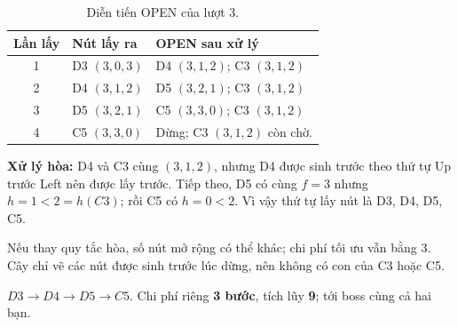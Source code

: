 \begin{table}[ht!]
    \centering
    \caption{Diễn tiến OPEN của lượt 3.}
    \small
    \renewcommand{\arraystretch}{1.3}
    \begin{tabularx}{\textwidth}{c l X}
        \toprule
        \textbf{Lần lấy} & \textbf{Nút lấy ra} & \textbf{OPEN sau xử lý} \\
        \midrule
        1 & D3 $(3,0,3)$ & D4 $(3,1,2)$; C3 $(3,1,2)$ \\
        2 & D4 $(3,1,2)$ & D5 $(3,2,1)$; C3 $(3,1,2)$ \\
        3 & D5 $(3,2,1)$ & C5 $(3,3,0)$; C3 $(3,1,2)$ \\
        4 & C5 $(3,3,0)$ & Dừng; C3 $(3,1,2)$ còn chờ. \\
        \bottomrule
    \end{tabularx}
\end{table}

\textbf{Xử lý hòa:} D4 và C3 cùng $(3,1,2)$, nhưng D4 được sinh trước theo thứ tự Up trước Left nên được lấy trước. Tiếp theo, D5 có cùng $f=3$ nhưng $h=1<2=h(C3)$; rồi C5 có $h=0<2$. Vì vậy thứ tự lấy nút là D3, D4, D5, C5.

Nếu thay quy tắc hòa, số nút mở rộng có thể khác; chi phí tối ưu vẫn bằng 3. Cây chỉ vẽ các nút được sinh trước lúc dừng, nên không có con của C3 hoặc C5.

\begin{calloutnote}
    $D3\to D4\to D5\to C5$. Chi phí riêng \textbf{3 bước}, tích lũy \textbf{9}; tới boss cùng cả hai bạn.
\end{calloutnote}
